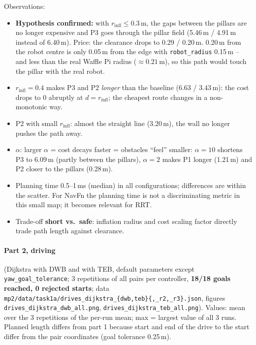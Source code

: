 \documentclass[10pt]{article}
\newcommand{\pkg}[1]{\texttt{#1}}
\begin{document}
Observations:
\begin{itemize}
  \item \textbf{Hypothesis confirmed:} with $r_\text{infl} \le 0.3$\,m, the gaps between the pillars are no longer
        expensive and P3 goes through the pillar field (5.46\,m / 4.91\,m instead of 6.40\,m). Price: the clearance
        drops to 0.29 / 0.20\,m. 0.20\,m from the robot centre is only 0.05\,m from the edge with
        \pkg{robot\_radius} 0.15\,m -- and less than the real Waffle Pi radius ($\approx 0.21$\,m), so this path
        would touch the pillar with the real robot.
  \item $r_\text{infl}=0.4$ makes P3 and P2 \emph{longer} than the baseline (6.63 / 3.43\,m): the cost drops to 0
        abruptly at $d = r_\text{infl}$; the cheapest route changes in a non-monotonic way.
  \item P2 with small $r_\text{infl}$: almost the straight line (3.20\,m), the wall no longer pushes the path away.
  \item $\alpha$: larger $\alpha$ = cost decays faster = obstacles ``feel'' smaller: $\alpha=10$ shortens P3 to 6.09\,m
        (partly between the pillars), $\alpha=2$ makes P1 longer (1.21\,m) and P2 closer to the pillars (0.28\,m).
  \item Planning time 0.5--1\,ms (median) in all configurations; differences are within the scatter.
        For NavFn the planning time is not a
        discriminating metric in this small map; it becomes relevant for RRT.
  \item Trade-off \textbf{short vs.\ safe}: inflation radius and cost scaling factor directly trade path length
        against clearance.
\end{itemize}

\paragraph{Part 2, driving} (Dijkstra with DWB and with TEB, default parameters except \pkg{yaw\_goal\_tolerance};
3 repetitions of all pairs per controller, \textbf{18/18 goals reached, 0 rejected starts}; data
\pkg{mp2/data/task1a/drives\_dijkstra\_\{dwb,teb\}\{,\_r2,\_r3\}.json}, figures \pkg{drives\_dijkstra\_dwb\_all.png},
\pkg{drives\_dijkstra\_teb\_all.png}). Values: mean over the 3 repetitions of the per-run mean; max = largest value
of all 3 runs. Planned length differs from part 1 because start and end of the drive to the start differ from the
pair coordinates (goal tolerance 0.25\,m).
\end{document}
